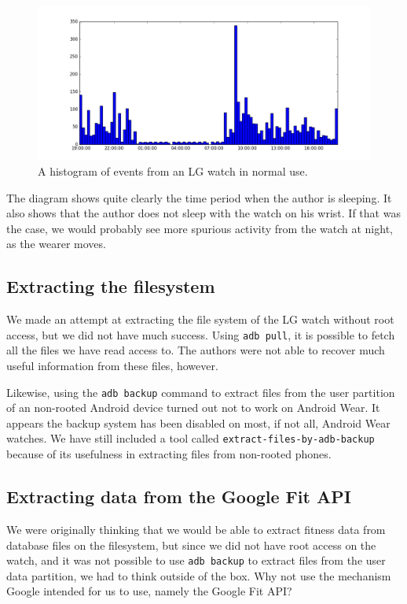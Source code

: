 \documentclass[a4paper,11pt,dvips]{article}
\begin{document}
\begin{figure}
\noindent
\includegraphics[natwidth=1301bp,natheight=600bp,width=\linewidth]{eventlog}
\caption{A histogram of events from an LG watch in normal use.}
\label{fig:eventlog}
\end{figure}

\noindent
The diagram shows quite clearly the time period when the author is sleeping. It also shows that the author does not sleep with the watch on his wrist. If that was the case, we would probably see more spurious activity from the watch at night, as the wearer moves.


\subsection{Extracting the filesystem}

We made an attempt at extracting the file system of the LG watch without root access, but we did not have much success. Using \texttt{adb pull}, it is possible to fetch all the files we have read access to. The authors were not able to recover much useful information from these files, however.

Likewise, using the \texttt{adb backup} command to extract files from the user partition of an non-rooted Android device turned out not to work on Android Wear. It appears the backup system has been disabled on most, if not all, Android Wear watches. We have still included a tool called \texttt{extract-files-by-adb-backup} because of its usefulness in extracting files from non-rooted phones.


\subsection{Extracting data from the Google Fit API}

We were originally thinking that we would be able to extract fitness data from database files on the filesystem, but since we did not have root access on the watch, and it was not possible to use \texttt{adb backup} to extract files from the user data partition, we had to think outside of the box. Why not use the mechanism Google intended for us to use, namely the Google Fit API?
\end{document}
